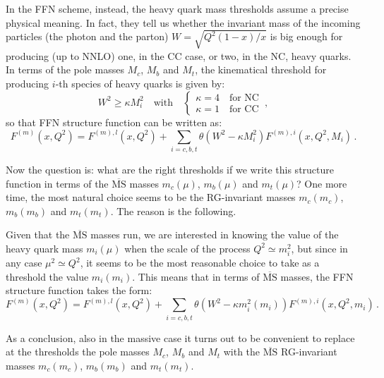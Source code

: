 \documentclass[10pt,a4paper]{article}
\begin{document}
In the FFN scheme, instead, the heavy quark mass thresholds assume a precise physical meaning. In fact, they tell us whether the invariant mass of the incoming particles (the photon and the parton) $W=\sqrt{Q^2(1-x)/x}$ is big enough for producing (up to NNLO) one, in the CC case, or two, in the NC, heavy quarks. In terms of the pole masses $M_c$, $M_b$ and $M_t$, the kinematical threshold for producing $i$-th species of heavy quarks is given by:
\begin{equation}
W^2\geq \kappa M_i^2\quad\mbox{with}\quad
\left\{\begin{array}{l}
\kappa = 4\quad\mbox{for NC}\\
\kappa = 1\quad\mbox{for CC}
\end{array}\right.\,,
\end{equation}
so that FFN structure function can be written as:
\begin{equation}
F^{(m)}(x,Q^2) = F^{(m),l}(x,Q^2)+\sum_{i=c,b,t}\theta(W^2-\kappa M_i^2)F^{(m),i}(x,Q^2,M_i)\,.
\end{equation}

Now the question is: what are the right thresholds if we write this structure function in terms of the $\overline{\mbox{MS}}$ masses $m_c(\mu)$, $m_b(\mu)$ and $m_t(\mu)$? One more time, the most natural choice seems to be the RG-invariant masses  $m_c(m_c)$, $m_b(m_b)$ and $m_t(m_t)$. The reason is the following. 

Given that the $\overline{\mbox{MS}}$ masses run, we are interested in knowing the value of the heavy quark mass $m_i(\mu)$ when the scale of the process $Q^2\simeq m_i^2$, but since in any case $\mu^2\simeq Q^2$, it seems to be the most reasonable choice to take as a threshold the value $m_i(m_i)$. This means that in terms of $\overline{\mbox{MS}}$ masses, the FFN structure function takes the form:
\begin{equation}
F^{(m)}(x,Q^2) = F^{(m),l}(x,Q^2)+\sum_{i=c,b,t}\theta(W^2-\kappa m_i^2(m_i))F^{(m),i}(x,Q^2,m_i)\,.
\end{equation}

As a conclusion, also in the massive case it turns out to be convenient to replace at the thresholds the pole masses $M_c$, $M_b$ and $M_t$ with the $\overline{\mbox{MS}}$ RG-invariant masses $m_c(m_c)$, $m_b(m_b)$ and $m_t(m_t)$.

%

\newpage


\end{document}
